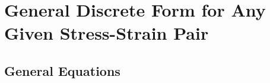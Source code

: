 %
\chapter{General Discrete Form for Any Given Stress-Strain Pair}

\section{General Equations}


\subsection{}


\section{}
